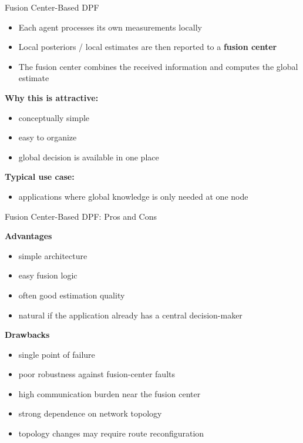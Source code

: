\documentclass[aspectratio=169]{beamer}
\begin{document}
\begin{frame}{Fusion Center-Based DPF}

\begin{itemize}
    \item Each agent processes its own measurements locally
    \item Local posteriors / local estimates are then reported to a \textbf{fusion center}
    \item The fusion center combines the received information and computes the global estimate
\end{itemize}

\vspace{0.3cm}

\textbf{Why this is attractive:}
\begin{itemize}
    \item conceptually simple
    \item easy to organize
    \item global decision is available in one place
\end{itemize}

\vspace{0.3cm}

\textbf{Typical use case:}
\begin{itemize}
    \item applications where global knowledge is only needed at one node
\end{itemize}

\end{frame}


\begin{frame}{Fusion Center-Based DPF: Pros and Cons}

\textbf{Advantages}
\begin{itemize}
    \item simple architecture
    \item easy fusion logic
    \item often good estimation quality
    \item natural if the application already has a central decision-maker
\end{itemize}

\vspace{0.3cm}

\textbf{Drawbacks}
\begin{itemize}
    \item single point of failure
    \item poor robustness against fusion-center faults
    \item high communication burden near the fusion center
    \item strong dependence on network topology
    \item topology changes may require route reconfiguration
\end{itemize}

\end{frame}
\end{document}
